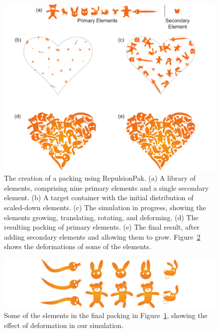 \begin{figure}
\vspace{-30pt}
\centering
\includegraphics[width=1.0\textwidth]{figures/repulsionpak/pipeline.pdf} 
\caption[RepulsionPak pipeline]
{\label{fig_repulsionpak_pipeline} 
The creation of a packing using RepulsionPak.
  (a) A library of elements, comprising nine primary elements and a single
  	secondary element.
  (b) A target container with the initial distribution of scaled-down elements.
  (c) The simulation in progress, showing the elements growing, translating,
  	rotating, and deforming.
  (d) The resulting packing of primary elements.
  (e) The final result, after adding secondary elements and allowing them to
  	grow.
  	Figure~\ref{fig_defviz} shows the deformations of some of the elements. }
\end{figure}

\begin{figure}
\centering
\includegraphics[width=1.0\textwidth]{figures/repulsionpak/pipeline_defviz_csk.pdf}
\caption[Element deformation]{
	\label{fig_defviz}
	Some of the elements in the final packing in Figure~\ref{fig_repulsionpak_pipeline}, 
	showing the effect of deformation in our simulation.
}
\end{figure}

